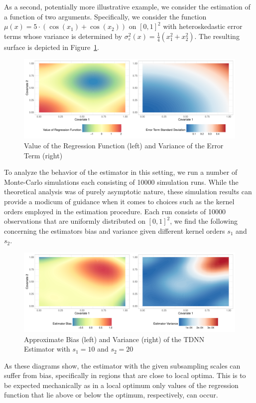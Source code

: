 \newpage
As a second, potentially more illustrative example, we consider the estimation of a function of two arguments.
Specifically, we consider the function $\mu(x) = 5 \cdot \left(\cos(x_1) + \cos(x_2)\right)$ on $[0,1]^2$ with heteroskedastic error terms whose variance is determined by $\sigma_{\varepsilon}^2(x) = \frac{1}{4}\left(x_1^2 + x_2^2\right)$.
The resulting surface is depicted in Figure~\ref{fig:reg_surface}.
\begin{figure}[H]
	\centering
	\includegraphics[width = \textwidth]{../Graphics/Reg_Exmp1.pdf}
	\caption{Value of the Regression Function (left) and Variance of the Error Term (right)}
	\label{fig:reg_surface}
\end{figure}
To analyze the behavior of the estimator in this setting, we run a number of Monte-Carlo simulations each consisting of 10000 simulation runs.
While the theoretical analysis was of purely asymptotic nature, these simulation results can provide a modicum of guidance when it comes to choices such as the kernel orders employed in the estimation procedure.
Each run consists of 10000 observations that are uniformly distributed on $[0,1]^2$, we find the following concerning the estimators bias and variance given different kernel orders $s_1$ and $s_2$.
\begin{figure}[H]
	\centering
	\includegraphics[width = \textwidth]{../Graphics/Reg_Exmp1_Est.pdf}
	\caption{Approximate Bias (left) and Variance (right) of the TDNN Estimator with $s_1 = 10$ and $s_2 = 20$}
	\label{fig:est_bias_var}
\end{figure}
As these diagrams show, the estimator with the given subsampling scales can suffer from bias, specifically in regions that are close to local optima.
This is to be expected mechanically as in a local optimum only values of the regression function that lie above or below the optimum, respectively, can occur.


